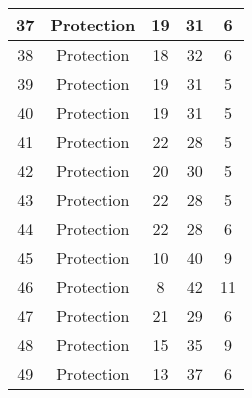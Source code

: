\documentclass[results.tex]{subfiles}
\begin{document}
\begin{center}
\begin{tabular}{| c || c | c | c | c |}
            \hline
            37                      & Protection                   & 19                     & 31                      & 6                    \\
            \hline
            38                      & Protection                   & 18                     & 32                      & 6                    \\
            \hline
            39                      & Protection                   & 19                     & 31                      & 5                    \\
            \hline
            40                      & Protection                   & 19                     & 31                      & 5                    \\
            \hline
            41                      & Protection                   & 22                     & 28                      & 5                    \\
            \hline
            42                      & Protection                   & 20                     & 30                      & 5                    \\
            \hline
            43                      & Protection                   & 22                     & 28                      & 5                    \\
            \hline
            44                      & Protection                   & 22                     & 28                      & 6                    \\
            \hline
            45                      & Protection                   & 10                     & 40                      & 9                    \\
            \hline
            46                      & Protection                   & 8                      & 42                      & 11                   \\
            \hline
            47                      & Protection                   & 21                     & 29                      & 6                    \\
            \hline
            48                      & Protection                   & 15                     & 35                      & 9                    \\
            \hline
            49                      & Protection                   & 13                     & 37                      & 6                    \\
            \hline
        \end{tabular}
    \end{center}
\end{document}
